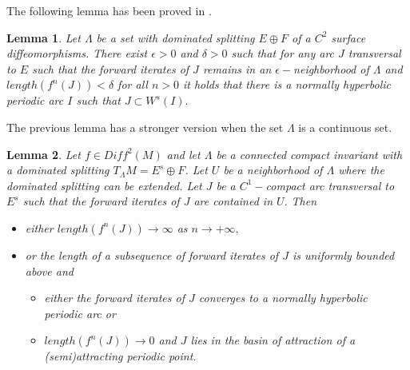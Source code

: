 \documentclass[a4paper,11pt]{article}
\newtheorem{lemma}{Lemma}
\theoremstyle{definition}
\def\La{\Lambda}
\def\e{\epsilon}
\def\eps{\epsilon}
\def\de{\delta}
\def\La{\Lambda}
\def\eps{\epsilon}
\begin{document}
The following lemma has been proved in \cite{PS1}.

\begin{lemma}\label{bounded-arcs} Let $\La$ be a set with dominated splitting $E\oplus F$ of a $C^2$ surface diffeomorphisms. There exist $\e>0$  and $\de>0$ such that for any  arc $J$ transversal to $E$ such that the forward iterates of $J$ remains in an $\e-$neighborhood of $\La$ and $length(f^n(J))<\de$ for all $n>0$ it holds that there is a normally hyperbolic periodic arc $I$ such that $J\subset W^s(I).$
    
\end{lemma}





The previous lemma has a stronger version when the set $\La$ is a continuous set. 

 
 \begin{lemma}\label{centerunstable2} Let $f\in Diff^2(M)$ and let $\La$ be a connected   compact invariant  with a dominated splitting $T_\La M=E^s\oplus F$. Let $U$ be a neighborhood of $\La$ where the dominated splitting can be extended. Let $J$ be a $C^1-$compact arc transversal to $E^s$ such that the forward iterates of $J$ are contained in $U.$ Then

 \begin{itemize}
     \item[--] either $length(f^n(J))\to \infty$ as $n\to +\infty,$

     \item[--] or the   length of a subsequence of  forward iterates of $J$ is uniformly bounded  above and   

     \begin{itemize}

       \item[--] either the forward iterates of $J$ converges to a normally hyperbolic periodic arc or 
         \item[--] $length(f^n(J))\to 0$ and  $J$ lies in the basin of attraction of a (semi)attracting periodic point. 
     \end{itemize}

     
 \end{itemize}


 
     
 \end{lemma}
\end{document}
